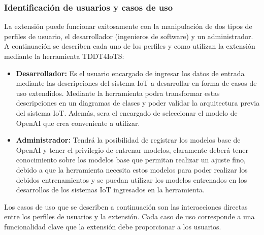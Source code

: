 \subsubsection{Identificación de usuarios y casos de uso}

La extensión puede funcionar exitosamente con la manipulación de dos tipos de perfiles de usuario, el desarrollador (ingenieros de software) y un administrador. A continuación se describen cada uno de los perfiles y como utilizan la extensión mediante la herramienta TDDT4IoTS:

\begin{itemize}
	\item \textbf{Desarrollador:} Es el usuario encargado de ingresar los datos de entrada mediante las descripciones del sistema IoT a desarrollar en forma de casos de uso extendidos. Mediante la herramienta podra transformar estas descripciones en un diagramas de clases y poder validar la arquitectura previa del sistema IoT. Además, sera el encargado de seleccionar el modelo de OpenAI que crea conveniente a utilizar.
	
	\item \textbf{Administrador:} Tendrá la posibilidad de registrar los modelos base de OpenAI y tener el privilegio de entrenar modelos, claramente deberá tener conocimiento sobre los modelos base que permitan realizar un ajuste fino, debido a que la herramienta necesita estos modelos para poder realizar los debidos entrenamientos y se puedan utilizar los modelos entrenados en los desarrollos de los sistemas IoT ingresados en la herramienta. 
\end{itemize}

Los casos de uso que se describen a continuación son las interacciones directas entre los perfiles de usuarios y la extensión. Cada caso de uso corresponde a una funcionalidad clave que la extensión debe proporcionar a los usuarios.

